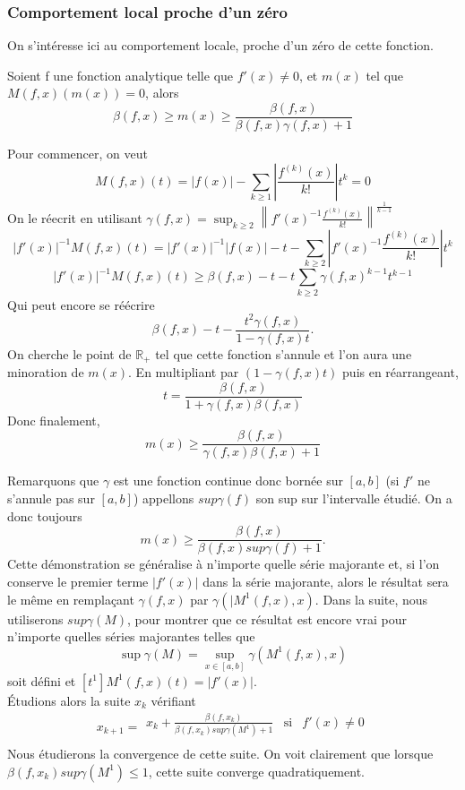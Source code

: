 \documentclass[a4paper,10.5pt]{article}
\begin{document}
	\subsubsection{Comportement local proche d'un zéro}
	On s'intéresse ici au comportement locale, proche d'un zéro de cette fonction.
	\begin{theorem}
		Soient f une fonction analytique telle que $f'(x)\neq 0$, et $m(x)$ tel que $M(f,x)(m(x))=0$, alors
		\[\beta(f,x) \geq m(x)\geq\frac{\beta(f,x)}{\beta(f,x)\gamma(f,x)+1}\]
	\end{theorem}
	\begin{demonstration}
		
		Pour commencer, on veut  
		\[M(f,x)(t)=|f(x)|-\sum_{k\geq1}|\frac{f^{(k)}(x)}{k!}|t^{k}=0\]
		On le réecrit en utilisant $\gamma(f,x)=\sup_{k \geq 2}\left\|f'(x)^{-1}\frac{f^{(k)}(x)}{k!}\right\|^{\frac{1}{k-1}}$
		\[|f'(x)|^{-1}M(f,x)(t)=|f'(x)|^{-1}|f(x)|-t-\sum_{k\geq2}|f'(x)^{-1}\frac{f^{(k)}(x)}{k!}|t^{k}\]
		\[|f'(x)|^{-1}M(f,x)(t)\geq \beta(f,x)-t-t\sum_{k\geq2}\gamma(f,x)^{k-1}t^{k-1}\]
		Qui peut encore se réécrire
		\[\beta(f,x)-t-\frac{t^2\gamma(f,x)}{1-\gamma(f,x) t}.\]
		On cherche le point de $\mathbb{R}_+$ tel que cette fonction s'annule et l'on aura une minoration de $m(x)$. En multipliant par $(1-\gamma(f,x) t)$ puis en réarrangeant,
		\[t=\frac{\beta(f,x)}{1+\gamma(f,x) \beta(f,x)}\]
		Donc finalement,
		\[m(x)\geq\frac{\beta(f,x)}{\gamma(f,x) \beta(f,x)+1} \]
	\end{demonstration}
	\vspace{7mm}
	Remarquons que $\gamma$ est une fonction continue donc bornée sur $[a,b]$ (si $f'$ ne s'annule pas sur $[a,b]$) appellons $sup\gamma(f)$ son sup sur l'intervalle étudié. On a donc toujours
	\[m(x)\geq\frac{\beta(f,x)}{\beta(f,x)sup\gamma(f)+1}.\]
	Cette démonstration se généralise à n'importe quelle série majorante et, si l'on conserve le premier terme $|f'(x)|$ dans la série majorante, alors le résultat sera le même en remplaçant $\gamma(f,x)$ par $\gamma(|M^1(f,x),x)$. Dans la suite, nous utiliserons $sup\gamma(M)$, pour montrer que ce résultat est encore vrai pour n'importe quelles séries majorantes telles que 
	\[\sup\gamma(M)=\sup_{x\in[a,b]}\gamma(M^1(f,x),x) \]
	soit défini et $[t^1]M^1(f,x)(t)=|f'(x)|$.
	\\
	Étudions alors la suite $x_k$ vérifiant 
	\begin{equation}
	x_{k+1}=
	\begin{array}{ccc}
	x_k+\frac{\beta(f,x_k)}{\beta(f,x_k)sup\gamma(M^1)+1} & \mbox{si} & f'(x)\neq 0\\
	\end{array}
	\end{equation}
	Nous étudierons la convergence de cette suite. On voit clairement que lorsque $\beta(f,x_k)sup\gamma(M^1)\leq 1$, cette suite converge quadratiquement.
	
\end{document}
